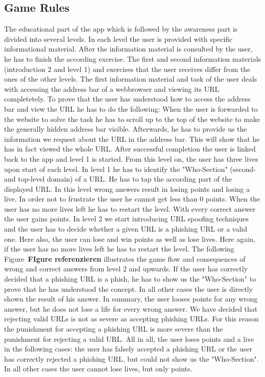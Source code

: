 \subsection{Game Rules}
The educational part of the app which is followed by the awareness part is divided into several levels. In each level the user is provided with specific informational material. After the information material is consulted by the user, he has to finish the according exercise. The first  and second information materials (introduction 2 and level 1) and exercises that the user receives differ from the ones of the other levels. The first information material and task of the user deals with accessing the address bar of a webbrowser and viewing its URL completetely. To prove that the user has understood how to access the address bar and view the URL he has to do the following: When the user is forwarded to the website to solve the task he has to scroll up to the top of the website to make the generally hidden address bar visible. Afterwards, he has to provide us the information we request about the URL in the address bar. This will show that he has in fact viewed the whole URL. After successful completion the user is linked back to the app and level 1 is started. From this level on, the user has three lives upon start of each level. In level 1 he has to identify the "Who-Section" (second- and top-level domain) of a URL. He has to tap the according part of the displayed URL. In this level wrong answers result in losing points and losing a live. In order not to frustrate the user he cannot get less than 0 points. When the user has no more lives left he has to restart the level. With every correct answer the user gains points.  In level 2 we start introducing URL spoofing techniques and the user has to decide whether a given URL is a phishing URL or a valid one. Here also, the user can lose and win points as well as lose lives. Here again, if the user has no more lives left he has to restart the level. The following Figure~\textbf{FIgure referenzieren} illustrates the game flow and consequences of wrong and correct answers from level 2 and upwards. If the user has correctly decided that a phishing URL is a phish, he has to show us the "Who-Section" to prove that he has understood the concept. In all other cases the user is directly shown the result of his answer. In summary, the user looses points for any wrong answer, but he does not lose a life for every wrong answer. We have decided that rejecting valid URLs is not as severe as accepting phishing URLs. For this reason the punishment for accepting a phishing URL is more severe than the punishment for rejecting a valid URL. All in all, the user loses points and a live in the following cases: the user has falsely accepted a phishing URL or the user has correctly rejected a phishing URL, but could not show us the "Who-Section". In all other cases the user cannot lose lives, but only points.

